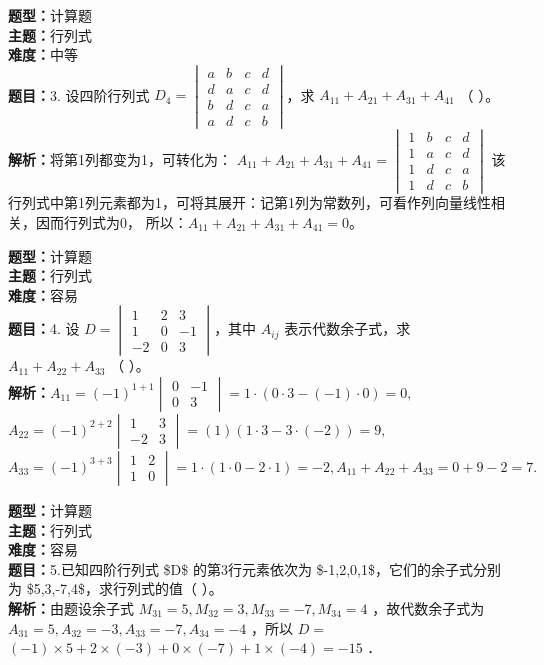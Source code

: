 \documentclass{ctexart}
\newenvironment{question}[5]{%
	\noindent\textbf{题型：}#1\\
	\textbf{主题：}#2\\
	\textbf{难度：}#3\\
	\textbf{题目：}#4\\
	\textbf{解析：}#5\\
	\vspace{1em}
}{}
\begin{document}
	
	\begin{question}
		{计算题}
		{行列式}
		{中等}
		{3. 设四阶行列式 $D_4=\begin{vmatrix}a & b & c & d \\ d & a & c & d \\ b & d & c & a \\ a & d & c & b\end{vmatrix}$，求 $A_{11} + A_{21} + A_{31} + A_{41}$ （ ）。}
		{将第1列都变为1，可转化为：
			$
			A_{11} + A_{21} + A_{31} + A_{41} = \begin{vmatrix}1 & b & c & d \\ 1 & a & c & d \\ 1 & d & c & a \\ 1 & d & c & b\end{vmatrix} 
			$
			该行列式中第1列元素都为1，可将其展开：记第1列为常数列，可看作列向量线性相关，因而行列式为0，
			所以：$A_{11} + A_{21} + A_{31} + A_{41} = 0$。}
	\end{question}
	
	\begin{question}
		{计算题}
		{行列式}
		{容易}
		{4. 设 $D=\begin{vmatrix}1 & 2 & 3 \\ 1 & 0 & -1 \\ -2 & 0 & 3\end{vmatrix}$，其中 $A_{ij}$ 表示代数余子式，求 $A_{11}+A_{22}+A_{33}$ （ ）。}
		{$A_{11} = (-1)^{1+1} \begin{vmatrix}0 & -1 \\ 0 & 3\end{vmatrix} = 1 \cdot (0 \cdot 3 - (-1)\cdot 0) = 0, $ $A_{22} = (-1)^{2+2} \begin{vmatrix}1 & 3 \\ -2 & 3\end{vmatrix} = (1)(1 \cdot 3 - 3 \cdot (-2)) = 9, $ $A_{33} = (-1)^{3+3} \begin{vmatrix}1 & 2 \\ 1 & 0\end{vmatrix} = 1 \cdot (1 \cdot 0 - 2 \cdot 1) = -2, A_{11} + A_{22} + A_{33} = 0 + 9 - 2 = 7.$}
	\end{question}
	
	\begin{question}
		{计算题}
		{行列式}
		{容易}
		{5.已知四阶行列式 \$D\$ 的第3行元素依次为 \$-1,2,0,1\$，它们的余子式分别为 \$5,3,-7,4\$，求行列式的值（ ）。}
		{由题设余子式 $M_{31}=5, M_{32}=3, M_{33}=-7, M_{34}=4$ ，故代数余子式为 $A_{31}=5, A_{32}=-3, A_{33}=-7, A_{34}=-4$ ，所以 $D=$ $(-1) \times 5+2 \times(-3)+0 \times(-7)+1 \times(-4)=-15$ ．}
	\end{question}
	
\end{document}
